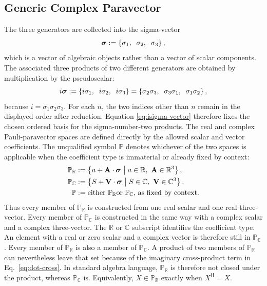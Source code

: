 \documentclass[10pt,letterpaper]{article}
\let\STAamsmathtext\text
\newcommand{\eqtext}[1]{\STAamsmathtext{\normalfont\rmfamily #1}}
\renewcommand{\text}[1]{\STAamsmathtext{\normalfont\rmfamily #1}}
\newcommand{\R}{\mathbb{R}}
\newcommand{\C}{\mathbb{C}}
\newcommand{\Pspace}{\mathbb{P}}
\newcommand{\RPspace}{\Pspace_{\R}}
\newcommand{\CPspace}{\Pspace_{\C}}
\newcommand{\pv}[1]{#1}
\newcommand{\vct}[1]{\mathbf{#1}}
\newcommand{\sigv}{\vct{\pv{\bm{\sigma}}}}
\newcommand{\Hop}{\mathsf H}
\newcommand{\herm}[1]{#1^{\Hop}}
\newcommand{\vthree}[3]{%
  \left\{#1,\mkern10mu #2,\mkern10mu #3\right\}%
}
\begin{document}
\subsection{Generic Complex Paravector}
The three generators are collected into the sigma-vector
\begin{equation}
\sigv := \vthree{\pv{\sigma}_1}{\pv{\sigma}_2}{\pv{\sigma}_3},
\label{eq:sigma-vector}
\end{equation}
which is a vector of algebraic objects rather than a vector of scalar
components. The associated three products of two different generators are
obtained by multiplication by the pseudoscalar:
\begin{equation}
i\sigv := \vthree{i\pv{\sigma}_1}{i\pv{\sigma}_2}{i\pv{\sigma}_3}
= \vthree{\pv{\sigma}_2\pv{\sigma}_3}
{\pv{\sigma}_3\pv{\sigma}_1}
{\pv{\sigma}_1\pv{\sigma}_2},
\label{eq:isigma-vector}
\end{equation}
because \(i=\pv{\sigma}_1\pv{\sigma}_2\pv{\sigma}_3\). For each \(n\), the
two indices other than \(n\) remain in the displayed order after reduction.
Equation \eqref{eq:isigma-vector} therefore fixes the chosen ordered basis
for the sigma-number-two products.
The real and complex Pauli-paravector spaces are defined directly by the
allowed scalar and vector coefficients. The unqualified symbol
\(\Pspace\) denotes whichever of the two spaces is applicable when the
coefficient type is immaterial or already fixed by context:
\begin{equation}
\begin{aligned}
\RPspace
&:=\left\{a+\vct{A}\cdot\sigv\ \middle|\;
a\in\R,\ \vct{A}\in\R^3\right\},\\
\CPspace
&:=\left\{S+\vct{V}\cdot\sigv\ \middle|\;
S\in\C,\ \vct{V}\in\C^3\right\},\\
\Pspace
&:=\eqtext{either }\RPspace\eqtext{ or }\CPspace
\eqtext{, as fixed by context}.
\end{aligned}
\label{eq:paravector-spaces}
\end{equation}
Thus every member of \(\RPspace\) is constructed from one real scalar and
one real three-vector. Every member of \(\CPspace\) is constructed in the
same way with a complex scalar and a complex three-vector. The
\(\R\) or \(\C\) subscript identifies the coefficient type. An element with
a real or zero scalar and a complex vector is therefore still in
\(\CPspace\). Every
member of \(\RPspace\) is also a member of \(\CPspace\). A product of two
members of \(\RPspace\) can nevertheless
leave that set because of the imaginary cross-product term in
Eq.\ \eqref{eq:dot-cross}. In standard algebra language,
\(\RPspace\) is therefore not closed under the product, whereas
\(\CPspace\) is. Equivalently,
\(\pv{X}\in\RPspace\) exactly when \(\herm{\pv{X}}=\pv{X}\).
\end{document}
